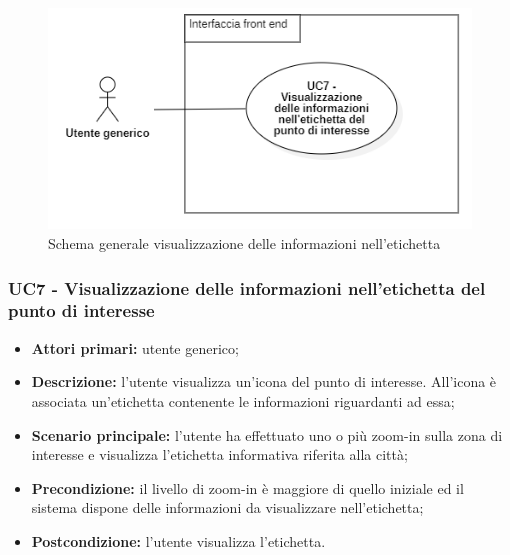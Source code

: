 \begin{center}
	\begin{figure}[H]
		\centering\includegraphics[scale=0.8]{../immagini/attori_casi/UC_7.png}
		\caption{Schema generale visualizzazione delle informazioni nell'etichetta}
	\end{figure}
\end{center}


\subsubsection{UC7 - Visualizzazione delle informazioni nell'etichetta del punto di interesse}\label{CasiDUsoCasiDUsoTraUnUtenteEIlFrontEndElencoCasiDUsoUC312VisualizzazioneDelPopupDiUnPuntoDiInteresse}

\begin{itemize}
	\item \textbf{Attori primari:} utente generico;
	\item \textbf{Descrizione:} l’utente visualizza un'icona del punto di interesse. All'icona è associata un'etichetta contenente le informazioni riguardanti ad essa;
	\item \textbf{Scenario principale:} l’utente ha effettuato uno o più zoom-in sulla zona di interesse e visualizza l'etichetta informativa riferita alla città;
	\item \textbf{Precondizione:} il livello di zoom-in è maggiore di quello iniziale ed il sistema dispone delle informazioni da visualizzare nell'etichetta;
	\item \textbf{Postcondizione:} l’utente visualizza l'etichetta.
\end{itemize}

